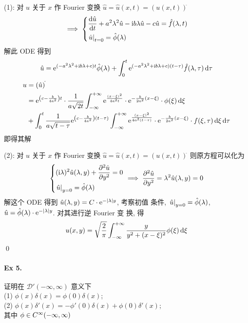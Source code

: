 \begin{solution}
(1): 对 $u$ 关于 $x$ 作 Fourier 变换 $\hat u = \hat u(x, t) = (u(x, t))^{\hat{}}$
\[\implies {\left\{ \begin{aligned} 
&{\frac{\operatorname{d\!}{\hat u}}{\operatorname{d\!}{t}}} +a^2\lambda^2\hat u -{\mathrm i}b\lambda\hat u -c\hat u
 =\hat f(\lambda, t) \\
&{\left.{\hat u} \right|}_{t=0} = \hat\phi(\lambda)
 \end{aligned} \right.}
\]
解此 ODE 得到
\[
\hat u = {\mathrm e}^{(-a^2\lambda^2 + {\mathrm i} b \lambda + c)t} \hat\phi(\lambda)
+ \int_0^t {\mathrm e}^{(-a^2\lambda^2 + {\mathrm i} b \lambda + c)(t - \tau)}
 \hat f(\lambda, \tau) \operatorname{d\!} \tau
\]
\[ \begin{aligned}
u &= (\hat u)^{\check{}} \\
&= {\mathrm e}^{{\left( {c-\frac{b}{4a^2}} \right)}t} \cdot \frac{1}{a\sqrt{2t}}
\int_{-\infty}^{+\infty} {\mathrm e}^{\frac{(x - \xi)^2}{4a^2t}} \cdot
{\mathrm e}^{-\frac{b}{2a^2}(x-\xi)} \cdot \phi(\xi) \operatorname{d\!} \xi \\
&+ \int_0^{t} \frac{1}{a\sqrt{t-\tau}} {\mathrm e}^{{\left( {c-\frac{b}{4a^2}} \right)}(t-\tau)}
\int_{-\infty}^{+\infty} {\mathrm e}^{\frac{(x - \xi)^2}{4a^2(t-\tau)}} \cdot
{\mathrm e}^{-\frac{b}{2a^2}(x-\xi)} \cdot f(\xi, \tau) \operatorname{d\!} \xi \operatorname{d\!} \tau
\end{aligned} \]
即得其解

\noindent (2): 对 $u$ 关于 $x$ 作 Fourier 变换
$\hat u = \hat u(x, t) = (u(x, t))^{\hat{}}$ 则原方程可以化为
\[ {\left\{ \begin{aligned} 
& ({\mathrm i}\lambda)^2 \hat u(\lambda, y)	+ {\frac{\partial {^2\hat u}}{\partial {y^2}}} = 0 \\
& {\left.{\hat u} \right|}_{y=0} = \hat \phi(\lambda)
 \end{aligned} \right.} \implies {\frac{\partial {^2\hat u}}{\partial {y^2}}} = \lambda^2\hat u(\lambda, y) = 0\]
解这个 ODE 得到 $\hat u(\lambda, y) = C \cdot {\mathrm e}^{-{\lvert {\lambda} \rvert} y}$, 考察初值
条件, ${\left.{\hat u} \right|}_{y=0} = \hat\phi(\lambda)$,
$\hat u = \hat\phi(\lambda) \cdot {\mathrm e}^{-{\lvert {\lambda} \rvert}y}$. 对其进行逆 Fourier 变
换, 得
\[
u(x, y) = \sqrt{\frac{2}{\pi}} \int_{-\infty}^{+\infty} \frac{y}{y^2+(x-\xi)^2}
\phi(\xi) \operatorname{d\!} \xi
\]
\qed
\end{solution}


\paragraph{Ex 5.}
证明在 $\mathcal D'(-\infty, \infty)$ 意义下 \\
(1) $\phi(x)\delta(x) = \phi(0)\delta(x)$; \\
(2) $\phi(x)\delta'(x) = -\phi'(0)\delta(x) + \phi(0)\delta'(x)$; \\
其中 $\phi \in C{^\infty(-\infty, \infty)}$

